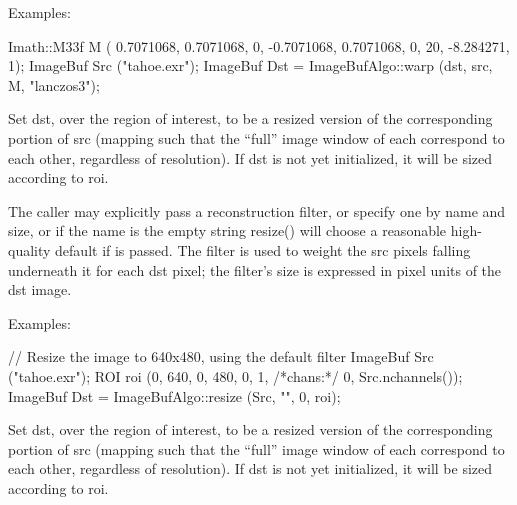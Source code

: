 \smallskip
\noindent Examples:
\begin{code}
    Imath::M33f M ( 0.7071068, 0.7071068, 0,
                   -0.7071068, 0.7071068, 0,
                   20,        -8.284271,  1);
    ImageBuf Src ("tahoe.exr");
    ImageBuf Dst = ImageBufAlgo::warp (dst, src, M, "lanczos3");
\end{code}
\apiend


 
Set {\cf dst}, over the region of interest, to be a resized version of the
corresponding portion of {\cf src} (mapping such that the ``full'' image
window of each correspond to each other, regardless of resolution).  If
{\cf dst} is not yet initialized, it will be sized according to {\cf roi}.

The caller may explicitly pass a reconstruction filter, or specify one by
name and size, or if the name is the empty string {\cf resize()} will choose
a reasonable high-quality default if \NULL is passed.  The filter is used to
weight the {\cf src} pixels falling underneath it for each {\cf dst} pixel;
the filter's size is expressed in pixel units of the {\cf dst} image.

\smallskip
\noindent Examples:
\begin{code}
    // Resize the image to 640x480, using the default filter
    ImageBuf Src ("tahoe.exr");
    ROI roi (0, 640, 0, 480, 0, 1, /*chans:*/ 0, Src.nchannels());
    ImageBuf Dst = ImageBufAlgo::resize (Src, "", 0, roi);
\end{code}
\apiend


 
Set {\cf dst}, over the region of interest, to be a resized version of the
corresponding portion of {\cf src} (mapping such that the ``full'' image
window of each correspond to each other, regardless of resolution).  If
{\cf dst} is not yet initialized, it will be sized according to {\cf roi}.

